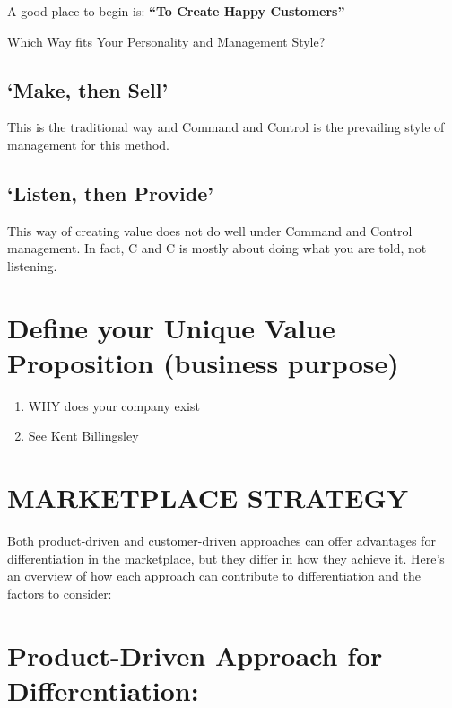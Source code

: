 \documentclass[
]{book}
\begin{document}
A good place to begin is: \textbf{``To Create Happy Customers''}

Which Way fits Your Personality and Management Style?

\hypertarget{make-then-sell}{%
\subsection{`Make, then Sell'}\label{make-then-sell}}

This is the traditional way and Command and Control is the prevailing style of management for this method.

\hypertarget{listen-then-provide}{%
\subsection{`Listen, then Provide'}\label{listen-then-provide}}

This way of creating value does not do well under Command and Control management. In fact, C and C is mostly about doing what you are told, not listening.

\hypertarget{define-your-unique-value-proposition-business-purpose}{%
\section{Define your Unique Value Proposition (business purpose)}\label{define-your-unique-value-proposition-business-purpose}}

\begin{enumerate}
\def\labelenumi{\arabic{enumi}.}
\item
  WHY does your company exist
\item
  See Kent Billingsley
\end{enumerate}

\hypertarget{marketplace-strategy-1}{%
\section{MARKETPLACE STRATEGY}\label{marketplace-strategy-1}}

Both product-driven and customer-driven approaches can offer advantages for differentiation in the marketplace, but they differ in how they achieve it. Here's an overview of how each approach can contribute to differentiation and the factors to consider:

\hypertarget{product-driven-approach-for-differentiation}{%
\section{Product-Driven Approach for Differentiation:}\label{product-driven-approach-for-differentiation}}
\end{document}
